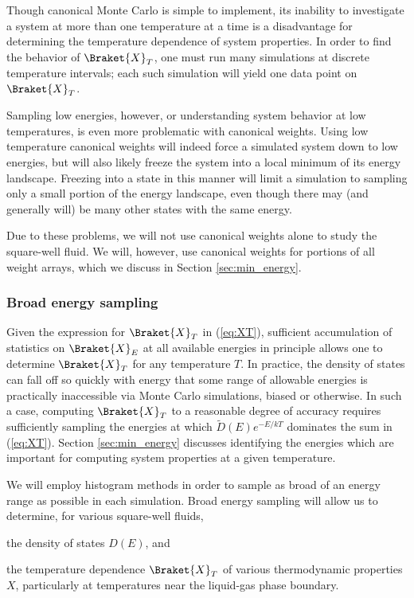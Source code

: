 \documentclass[11pt]{article}
\newcommand{\bk}{\Braket} %
\newcommand{\p}[1]{\left(#1\right)} %
\begin{document}
Though canonical Monte Carlo is simple to implement, its inability to
investigate a system at more than one temperature at a time is a
disadvantage for determining the temperature dependence of system
properties. In order to find the behavior of $\bk{X}_T$, one must run
many simulations at discrete temperature intervals; each such
simulation will yield one data point on $\bk{X}_T$.

Sampling low energies, however, or understanding system behavior at
low temperatures, is even more problematic with canonical
weights. Using low temperature canonical weights will indeed force a
simulated system down to low energies, but will also likely freeze the
system into a local minimum of its energy landscape. Freezing into a
state in this manner will limit a simulation to sampling only a small
portion of the energy landscape, even though there may (and generally
will) be many other states with the same energy.

Due to these problems, we will not use canonical weights alone to
study the square-well fluid. We will, however, use canonical weights
for portions of all weight arrays, which we discuss in Section
\ref{sec:min_energy}.

\subsubsection{Broad energy sampling}
\label{sec:broad_energy_sampling}

Given the expression for $\bk{X}_T$ in (\ref{eq:XT}), sufficient
accumulation of statistics on $\bk{X}_E$ at all available energies in
principle allows one to determine $\bk{X}_T$ for any temperature
$T$. In practice, the density of states can fall off so quickly with
energy that some range of allowable energies is practically
inaccessible via Monte Carlo simulations, biased or otherwise. In such
a case, computing $\bk{X}_T$ to a reasonable degree of accuracy
requires sufficiently sampling the energies at which $\tilde
D\p{E}e^{-E/kT}$ dominates the sum in (\ref{eq:XT}). Section
\ref{sec:min_energy} discusses identifying the energies which are
important for computing system properties at a given temperature.

We will employ histogram methods in order to sample as broad of an
energy range as possible in each simulation. Broad energy sampling
will allow us to determine, for various square-well fluids,
\begin{enumerate*}[label=\roman*)]
\item the density of states $D\p{E}$, and
\item the temperature dependence $\bk{X}_T$ of various thermodynamic
  properties $X$, particularly at temperatures near the liquid-gas
  phase boundary.
\end{enumerate*}
\end{document}
